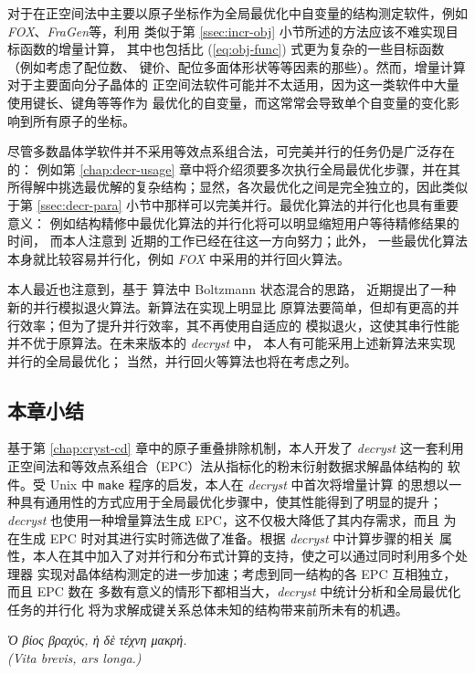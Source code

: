 对于在正空间法中主要以原子坐标作为全局最优化中自变量的结构测定软件，例如
\emph{FOX}\parencite{favre2002}、\emph{FraGen}\parencite{li2012}等，利用
类似于第 \ref{ssec:incr-obj} 小节所述的方法应该不难实现目标函数的增量计算，
其中也包括比 (\ref{eq:obj-func}) 式更为复杂的一些目标函数（例如考虑了配位数、
键价、配位多面体形状等等因素的那些）。然而，增量计算对于主要面向分子晶体的
正空间法软件可能并不太适用，因为这一类软件中大量使用键长、键角等等作为
最优化的自变量，而这常常会导致单个自变量的变化影响到所有原子的坐标。

尽管多数晶体学软件并不采用等效点系组合法，可完美并行的任务仍是广泛存在的：
例如第 \ref{chap:decr-usage} 章中将介绍须要多次执行全局最优化步骤，并在其
所得解中挑选最优解的复杂结构；显然，各次最优化之间是完全独立的，因此类似于第
\ref{ssec:decr-para} 小节中那样可以完美并行。最优化算法的并行化也具有重要意义：
例如结构精修中最优化算法的并行化将可以明显缩短用户等待精修结果的时间，
而本人注意到 \textcite{eremenko2017}近期的工作已经在往这一方向努力；此外，
一些最优化算法本身就比较容易并行化，例如 \emph{FOX} 中采用的并行回火算法。

本人最近也注意到，基于 \textcite{chu1999}算法中 Boltzmann 状态混合的思路，
\textcite{lou2016}近期提出了一种新的并行模拟退火算法。新算法在实现上明显比
原算法要简单，但却有更高的并行效率；但为了提升并行效率，其不再使用自适应的
模拟退火，这使其串行性能并不优于原算法。在未来版本的 \emph{decryst} 中，
本人有可能采用上述新算法来实现并行的全局最优化；
当然，并行回火等算法也将在考虑之列。

\subsection{本章小结}

基于第 \ref{chap:cryst-cd} 章中的原子重叠排除机制，本人开发了 \emph{decryst}
这一套利用正空间法和等效点系组合（EPC）法从指标化的粉末衍射数据求解晶体结构的
软件。受 Unix 中 \verb|make| 程序的启发，本人在 \emph{decryst} 中首次将增量计算
的思想以一种具有通用性的方式应用于全局最优化步骤中，使其性能得到了明显的提升；
\emph{decryst} 也使用一种增量算法生成 EPC，这不仅极大降低了其内存需求，而且
为在生成 EPC 时对其进行实时筛选做了准备。根据 \emph{decryst} 中计算步骤的相关
属性，本人在其中加入了对并行和分布式计算的支持，使之可以通过同时利用多个处理器
实现对晶体结构测定的进一步加速；考虑到同一结构的各 EPC 互相独立，而且 EPC 数在
多数有意义的情形下都相当大，\emph{decryst} 中统计分析和全局最优化任务的并行化
将为求解成键关系总体未知的结构带来前所未有的机遇。

\begin{rquote}{0.5\textwidth}
	\begingroup\setmainfont{GFS Didot}\itshape
	Ὁ βίος βραχύς, ἡ δὲ τέχνη μακρή.\endgroup\\
	(Vita brevis, ars longa.)
\end{rquote}


